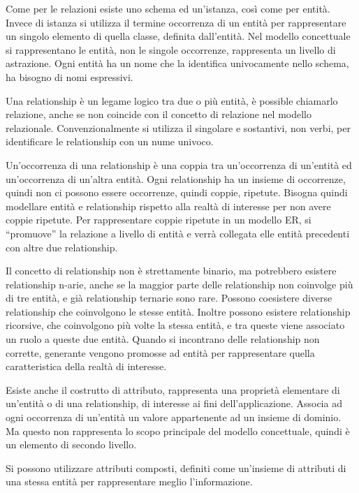 \documentclass{article}
\numberwithin{equation}{subsection}
\begin{document}
Come per le relazioni esiste uno schema ed un'istanza, così come per entità. Invece di istanza si utilizza il termine occorrenza di un entità per rappresentare un singolo 
elemento di quella classe, definita dall'entità. Nel modello concettuale si rappresentano le entità, non le singole occorrenze, rappresenta un livello di astrazione. 
Ogni entità ha un nome che la identifica univocamente nello schema, ha bisogno di nomi espressivi. 


Una relationship è un legame logico tra due o più entità, è possible chiamarlo relazione, anche se non coincide con il concetto di relazione nel modello relazionale. 
Convenzionalmente si utilizza il singolare e sostantivi, non verbi, per identificare le relationship con un nume univoco. 

Un'occorrenza di una relationship è una coppia tra un'occorrenza di un'entità ed un'occorrenza di un'altra entità. Ogni relationship ha un insieme di occorrenze, quindi 
non ci possono essere occorrenze, quindi coppie, ripetute. 
Bisogna quindi modellare entità e relationship rispetto alla realtà di interesse per non avere coppie ripetute. Per rappresentare coppie ripetute in un modello ER, si 
``promuove'' la relazione a livello di entità e verrà collegata elle entità precedenti con altre due relationship. 

Il concetto di relationship non è strettamente binario, ma potrebbero esistere relationship n-arie, anche se la maggior parte delle relationship non coinvolge più di tre 
entità, e già relationship ternarie sono rare. 
Possono coesistere diverse relationship che coinvolgono le stesse entità. Inoltre possono esistere relationship ricorsive, che coinvolgono più volte la stessa entità, 
e tra queste viene associato un ruolo a queste due entità. Quando si incontrano delle relationship non corrette, generante vengono promosse ad entità per rappresentare 
quella caratteristica della realtà di interesse. 

Esiste anche il costrutto di attributo, rappresenta una proprietà elementare di un'entità o di una relationship, di interesse ai fini dell'applicazione. Associa ad ogni 
occorrenza di un'entità un valore appartenente ad un insieme di dominio. Ma questo non rappresenta lo scopo principale del modello concettuale, quindi è un elemento 
di secondo livello. 

Si possono utilizzare attributi composti, definiti come un'insieme di attributi di una stessa entità per rappresentare meglio l'informazione. 
\end{document}
